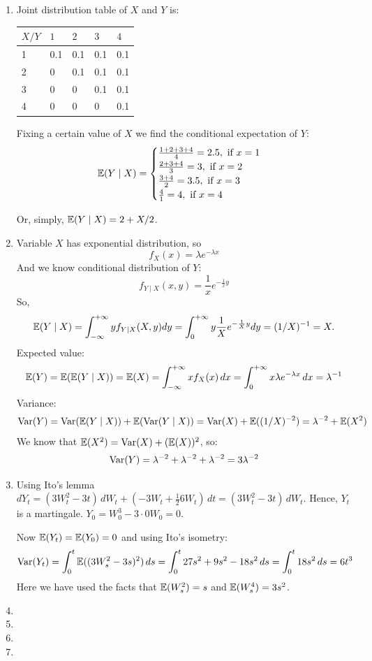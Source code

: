 \documentclass[12pt, a4paper]{article}
\begin{document}
\begin{enumerate}
\item Joint distribution table of $X$ and $Y$ is:

\begin{tabular}{lllll}
\toprule
$X/Y$ & $1$ & $2$ & $3$ & $4$\\
\midrule
1& 0.1 & 0.1 & 0.1 & 0.1 \\
2& 0 & 0.1 & 0.1 & 0.1 \\
3& 0 & 0 & 0.1 & 0.1 \\
4& 0 & 0 & 0 & 0.1 \\
\bottomrule
\end{tabular}

Fixing a certain value of $X$ we find the conditional expectation of $Y$:
\[
\operatorname{\mathbb{E}}(Y \mid X) =
\begin{cases}
  \frac{1+2+3+4}{4} = 2.5, \text{ if }  x=1\\
  \frac{2+3+4}{3} = 3, \text{ if } x=2\\
  \frac{3+4}{2} = 3.5, \text{ if } x=3\\
  \frac{4}{1} = 4, \text{ if }  x=4\\
\end{cases}
\]

Or, simply, $\operatorname{\mathbb{E}}(Y \mid X) = 2 + X/2$.

\item Variable $X$ has exponential distribution, so
\[
f_X(x)=\lambda e^{-\lambda x}
\]
And we know conditional distribution of $Y$:
\[
f_{Y \mid X}(x,y)=\frac{1}{x} e^{-\frac{1}{x}y}
\]
So,
\[
\operatorname{\mathbb{E}}(Y \mid X) = \int_{-\infty}^{+\infty}  y { f_{Y \mid X}(X,y)} dy=  \int _0^{+\infty} y  \frac{1}{X} e^{-\frac{1}{X}y} dy =  (1/X)^{-1} = X.
\]
Expected value:
\[
\operatorname{\mathbb{E}}(Y) =\operatorname{\mathbb{E}}(\operatorname{\mathbb{E}}(Y \mid X)) =\operatorname{\mathbb{E}}(X) =  \int _{-\infty}^{+\infty}x f_X(x) \, dx=  \int _0^{+\infty} x \lambda e^{-\lambda x} \, dx =\lambda^{-1}
\]
Variance:
\[
\operatorname{Var}(Y) =\operatorname{Var}(\operatorname{\mathbb{E}}(Y \mid X))+ \operatorname{\mathbb{E}}( \operatorname{Var}(Y \mid X)) = \operatorname{Var}(X)+ \operatorname{\mathbb{E}} ((1/X)^{-2})= \lambda^{-2} + \operatorname{\mathbb{E}}(X^2)
\]
We know that $\operatorname{\mathbb{E}}(X^2) = \operatorname{Var}(X) + (\operatorname{\mathbb{E}}(X))^2$, so:
\[
\operatorname{Var}(Y) = \lambda^{-2}+\lambda^{-2} + \lambda^{-2} = 3\lambda^{-2}
\]

\item Using Ito's lemma $dY_t = (3W_t^2 - 3t) \, dW_t + (-3W_t + \frac{1}{2}6W_t) \, dt= (3W_t^2 - 3t) \, dW_t$. 
Hence, $Y_t$ is a martingale. $Y_0 = W_0^3 - 3\cdot 0 W_0 = 0$.

Now $\operatorname{\mathbb{E}}(Y_t) = \operatorname{\mathbb{E}}(Y_0) = 0$ and using Ito's isometry:
\[
\operatorname{Var}(Y_t)=
\int_0^t \operatorname{\mathbb{E}}((3W_s^2-3s)^2) \, ds = \int_0^t 27s^2 +9s^2-18s^2 \, ds = \int_0^t 18s^2 \, ds = 6t^3
\]
%
Here we have used the facts that $\operatorname{\mathbb{E}}(W_s^2) = s$ and $\operatorname{\mathbb{E}}(W_s^4) = 3s^2$.
\item
\item
\item
\item 


\end{enumerate}
\end{document}
